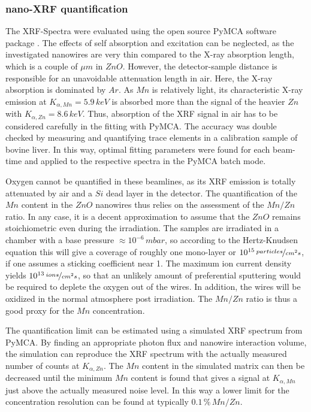 \subsubsection{nano-XRF quantification}

The XRF-Spectra were evaluated using the open source PyMCA software package \cite{sole_multiplatform_2007}. The effects of self absorption and excitation can be neglected, as the investigated nanowires are very thin compared to the X-ray absorption length, which is a couple of $\mu m$ in $ZnO$. However, the detector-sample distance is responsible for an unavoidable attenuation length in air. Here, the X-ray absorption is dominated by $Ar$. As $Mn$ is relatively light, its characteristic X-ray emission at $K_{\alpha,Mn} = 5.9\,keV$ is absorbed more than the signal of the heavier $Zn$ with $K_{\alpha,Zn} = 8.6\,keV$. Thus, absorption of the XRF signal in air has to be considered carefully in the fitting with PyMCA. The accuracy was double checked by measuring and quantifying trace elements in a calibration sample of bovine liver. In this way, optimal fitting parameters were found for each beam-time and applied to the respective spectra in the PyMCA batch mode. 

Oxygen cannot be quantified in these beamlines, as its XRF emission is totally attenuated by air and a $Si$ dead layer in the detector. The quantification of the $Mn$ content in the $ZnO$ nanowires thus relies on the assessment of the $Mn/Zn$ ratio. In any case, it is a decent approximation to assume that the $ZnO$ remains stoichiometric even during the irradiation. The samples are irradiated in a chamber with a base pressure $\approx 10^{-6}\,mbar$, so according to the Hertz-Knudsen equation \cite{kolasinski_surface_2012} this will give a coverage of roughly one mono-layer or $10^{15}\,\nicefrac{particles}{cm^2s}$, if one assumes a sticking coefficient near 1. The maximum ion current density yields $10^{13}\,\nicefrac{ions}{cm^2s}$, so that an unlikely amount of preferential sputtering would be required to deplete the oxygen out of the wires. In addition, the wires will be oxidized in the normal atmosphere post irradiation. The $Mn/Zn$ ratio is thus a good proxy for the $Mn$ concentration.

The quantification limit can be estimated using a simulated XRF spectrum from PyMCA. By finding an appropriate photon flux and nanowire interaction volume, the simulation can reproduce the XRF spectrum with the actually measured number of counts at $K_{\alpha,Zn}$. The $Mn$ content in the simulated matrix can then be decreased until the minimum $Mn$ content is found that gives a signal at $K_{\alpha,Mn}$ just above the actually measured noise level. In this way a lower limit for the concentration resolution can be found at typically $0.1\,\%\,Mn/Zn$.



